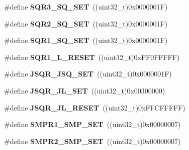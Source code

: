 \begin{DoxyCompactItemize}
\item 
\#define {\bfseries S\+Q\+R3\+\_\+\+S\+Q\+\_\+\+S\+ET}~((uint32\+\_\+t)0x0000001\+F)\hypertarget{group___a_d_c_gaaed9be4552724197505e5e4d23fcf7df}{}\label{group___a_d_c_gaaed9be4552724197505e5e4d23fcf7df}

\item 
\#define {\bfseries S\+Q\+R2\+\_\+\+S\+Q\+\_\+\+S\+ET}~((uint32\+\_\+t)0x0000001\+F)\hypertarget{group___a_d_c_ga39495128596ac3def40413414272f661}{}\label{group___a_d_c_ga39495128596ac3def40413414272f661}

\item 
\#define {\bfseries S\+Q\+R1\+\_\+\+S\+Q\+\_\+\+S\+ET}~((uint32\+\_\+t)0x0000001\+F)\hypertarget{group___a_d_c_ga72ecdac96f13a034c41f1e7f8ce3b45c}{}\label{group___a_d_c_ga72ecdac96f13a034c41f1e7f8ce3b45c}

\item 
\#define {\bfseries S\+Q\+R1\+\_\+\+L\+\_\+\+R\+E\+S\+ET}~((uint32\+\_\+t)0x\+F\+F0\+F\+F\+F\+F\+F)\hypertarget{group___a_d_c_gaf7266f2602d12f1dca080669583aea4f}{}\label{group___a_d_c_gaf7266f2602d12f1dca080669583aea4f}

\item 
\#define {\bfseries J\+S\+Q\+R\+\_\+\+J\+S\+Q\+\_\+\+S\+ET}~((uint32\+\_\+t)0x0000001\+F)\hypertarget{group___a_d_c_gac4cf4825da426e3ecdb87967854c834e}{}\label{group___a_d_c_gac4cf4825da426e3ecdb87967854c834e}

\item 
\#define {\bfseries J\+S\+Q\+R\+\_\+\+J\+L\+\_\+\+S\+ET}~((uint32\+\_\+t)0x00300000)\hypertarget{group___a_d_c_gaaee3ea0188e1d2b30d6d0e0a211c630d}{}\label{group___a_d_c_gaaee3ea0188e1d2b30d6d0e0a211c630d}

\item 
\#define {\bfseries J\+S\+Q\+R\+\_\+\+J\+L\+\_\+\+R\+E\+S\+ET}~((uint32\+\_\+t)0x\+F\+F\+C\+F\+F\+F\+F\+F)\hypertarget{group___a_d_c_gaf129b56688ca71eb3a54f8d513f40067}{}\label{group___a_d_c_gaf129b56688ca71eb3a54f8d513f40067}

\item 
\#define {\bfseries S\+M\+P\+R1\+\_\+\+S\+M\+P\+\_\+\+S\+ET}~((uint32\+\_\+t)0x00000007)\hypertarget{group___a_d_c_ga844e95644b6b0ce035db737cf6a2f3ef}{}\label{group___a_d_c_ga844e95644b6b0ce035db737cf6a2f3ef}

\item 
\#define {\bfseries S\+M\+P\+R2\+\_\+\+S\+M\+P\+\_\+\+S\+ET}~((uint32\+\_\+t)0x00000007)\hypertarget{group___a_d_c_ga13b8e9e5253f17d6f1d6e68a6feb8947}{}\label{group___a_d_c_ga13b8e9e5253f17d6f1d6e68a6feb8947}


\end{DoxyCompactItemize}
